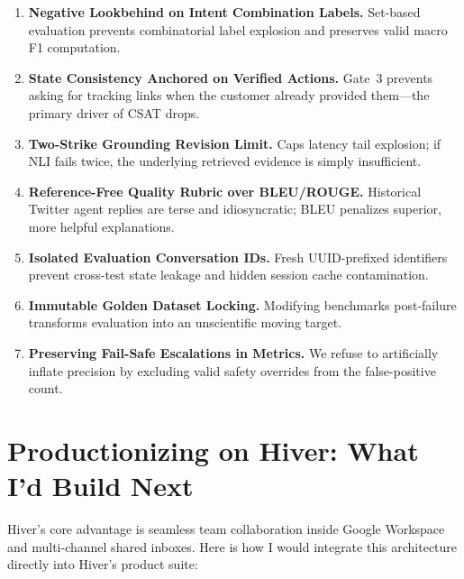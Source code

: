 \documentclass[10pt,twocolumn,a4paper]{article}
\begin{document}
\begin{enumerate}[label=\textbf{\arabic*.},itemsep=3pt,leftmargin=16pt]
  \item \textbf{Negative Lookbehind on Intent Combination Labels.}
        Set-based evaluation prevents combinatorial label explosion
        and preserves valid macro F1 computation.

  \item \textbf{State Consistency Anchored on Verified Actions.}
        Gate~3 prevents asking for tracking links when the customer
        already provided them---the primary driver of CSAT drops.

  \item \textbf{Two-Strike Grounding Revision Limit.}
        Caps latency tail explosion; if NLI fails twice, the
        underlying retrieved evidence is simply insufficient.

  \item \textbf{Reference-Free Quality Rubric over BLEU/ROUGE.}
        Historical Twitter agent replies are terse and idiosyncratic;
        BLEU penalizes superior, more helpful explanations.

  \item \textbf{Isolated Evaluation Conversation IDs.}
        Fresh UUID-prefixed identifiers prevent cross-test state
        leakage and hidden session cache contamination.

  \item \textbf{Immutable Golden Dataset Locking.}
        Modifying benchmarks post-failure transforms evaluation
        into an unscientific moving target.

  \item \textbf{Preserving Fail-Safe Escalations in Metrics.}
        We refuse to artificially inflate precision by excluding
        valid safety overrides from the false-positive count.
\end{enumerate}

\section{Productionizing on Hiver: What I'd Build Next}
\label{sec:hiver}

Hiver's core advantage is seamless team collaboration inside Google
Workspace and multi-channel shared inboxes. Here is how I would
integrate this architecture directly into Hiver's product suite:
\end{document}
